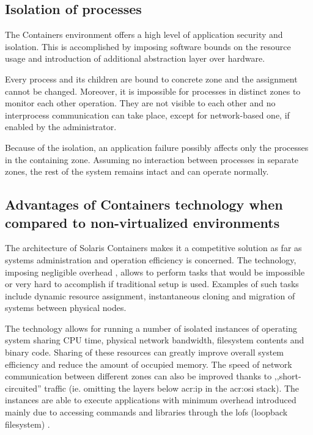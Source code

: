\documentclass[11pt]{book}
\begin{document}
      \subsection{Isolation of processes}
      \label{sub:}

        The Containers environment offers a high level of application security and isolation. This is accomplished by
        imposing software bounds on the resource usage and introduction of additional abstraction layer over hardware.

        Every process and its children are bound to concrete zone and the assignment cannot be changed. Moreover, it is
        impossible for processes in distinct zones to monitor each other operation. They are not visible to each other
        and no interprocess communication can take place, except for network-based one, if enabled by the administrator.

        Because of the isolation, an application failure possibly affects only the processes in the containing zone.
        Assuming no interaction between processes in separate zones, the rest of the system remains intact and can
        operate normally.
        
      

      \subsection{Advantages of Containers technology when compared to non-virtualized environments}
      \label{sub:}

        The architecture of Solaris Containers makes it a competitive solution as far as systems administration and
        operation efficiency is concerned. The technology, imposing negligible overhead \cite{price}, allows to perform
        tasks that would be impossible or very hard to accomplish if traditional setup is used. Examples of such tasks
        include dynamic resource assignment, instantaneous cloning and migration of systems between physical nodes.

        The technology allows for running a number of isolated instances of operating system sharing CPU time, physical
        network bandwidth, filesystem contents and binary code. Sharing of these resources can greatly improve overall
        system efficiency and reduce the amount of occupied memory. The speed of network communication between different
        zones can also be improved thanks to ,,short-circuited'' traffic (ie. omitting the layers below \gls{acr:ip} in
        the \gls{acr:osi} stack). The instances are able to execute applications with minimum overhead introduced mainly
        due to accessing commands and libraries through the lofs (loopback filesystem) \cite{price,fsag}.
\end{document}
